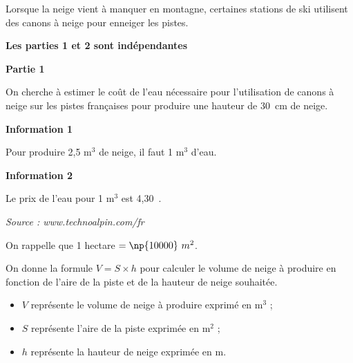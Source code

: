 \documentclass[exercice,a4]{thedocument}%
\begin{document}
%
    
    \def\euro{\texteuro}%
    \def\degres{\textsuperscript{\textdegree}}%

\medskip

Lorsque la neige vient à manquer en montagne, certaines stations de ski utilisent des canons à neige pour enneiger les pistes.

\medskip

\textbf{Les parties 1 et 2 sont indépendantes}

\medskip

\textbf{Partie 1}

\medskip

On cherche à estimer le coût de l’eau nécessaire pour l'utilisation de canons à neige sur les pistes françaises pour produire une hauteur de 30~cm de neige.

\textbf{Information 1}

Pour produire 2,5 m$^3$ de neige, il faut 1 m$^3$ d’eau.

\textbf{Information 2}

Le prix de l’eau pour 1 m$^3$ est 4,30~\euro.

{\small \emph{Source : www.technoalpin.com/fr}}

On rappelle que 1 hectare $= \np{10000}~m^2$.

On donne la formule $V = S \times h$ pour calculer le volume de neige à produire en fonction de l’aire de la piste et de la hauteur de neige souhaitée.

\begin{itemize}[label=$\bullet~$]
\item $V$ représente le volume de neige à produire exprimé en m$^3$ ;
\item $S$ représente l’aire de la piste exprimée en m$^2$ ;
\item $h$ représente la hauteur de neige exprimée en m.
\end{itemize}

\medskip
\end{document}
